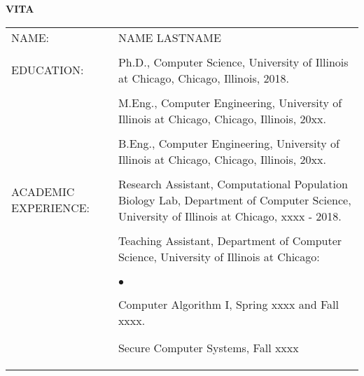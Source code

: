 \documentclass{uicthesi}
\newcommand{\squishlist}{
   \begin{list}{$\bullet$}
    { \setlength{\itemsep}{-.1ex}      \setlength{\parsep}{0ex}
      \setlength{\topsep}{0ex}       \setlength{\partopsep}{0ex}
      \setlength{\leftmargin}{.8em} \setlength{\labelwidth}{1em}
      \setlength{\labelsep}{0.5em} } }
\newcommand{\squishend}{\end{list}}
\begin{document}
\bibformb

\newpage
\clearpage
    \pagestyle{pageontop}
   \thispagestyle{pageonbottom}
   \begin{large}
   \begin{center}
   {\bfseries VITA}
   \end{center}
   \end{large}
\begin{tabular}{p{2.8cm}p{10.5cm}}
NAME: & NAME LASTNAME  \\ 
    &\\
EDUCATION:  &Ph.D., Computer Science, University of Illinois at Chicago, Chicago, Illinois, 2018. \\  
            &\\
            &M.Eng., Computer Engineering, University of Illinois at Chicago, Chicago, Illinois, 20xx.\\
            &\\
            &B.Eng., Computer Engineering, University of Illinois at Chicago, Chicago, Illinois, 20xx.  \\
            &\\
ACADEMIC EXPERIENCE:  &Research Assistant, Computational Population Biology Lab, Department of Computer Science, University of Illinois at Chicago, xxxx - 2018. \\
            &\\
            &Teaching Assistant, Department of Computer Science, University of Illinois at Chicago: \\
            &\squishlist            
            \item Computer Algorithm I, Spring xxxx and  Fall xxxx.    
            \item Secure Computer Systems, Fall xxxx 
            \squishend \\
            

 \end{tabular}
\end{document}
